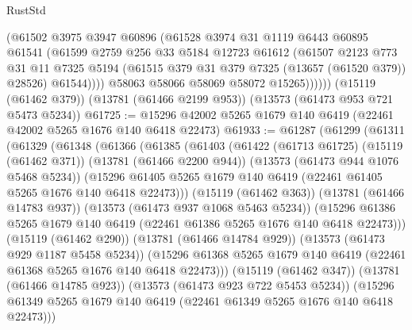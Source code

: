 \begin{lexlean}{RustStd}
\begin{coremodule}
                (@61502
                  @3975
                  @3947
                  @60896
                  (@61528
                    @3974
                    @31
                    @1119
                    @6443
                    @60895
                    @61541
                    (@61599
                      @2759
                      @256
                      @33
                      @5184
                      @12723
                      @61612
                      (@61507
                        @2123
                        @773
                        @31
                        @11
                        @7325
                        @5194
                        (@61515 @379 @31 @379 @7325 (@13657 (@61520 @379)) @28526)
                        @61544))))
                @58063
                @58066
                @58069
                @58072
                @15265))))))
    (@15119 (@61462 @379))
    (@13781 (@61466 @2199 @953))
    (@13573 (@61473 @953 @721 @5473 @5234))
@61725 := @15296 @42002 @5265 @1679 @140 @6419 (@22461 @42002 @5265 @1676 @140 @6418 @22473)
@61933 := @61287
    (@61299
      (@61311
        (@61329
          (@61348
            (@61366
              (@61385
                (@61403
                  (@61422
                    (@61713 @61725)
                    (@15119 (@61462 @371))
                    (@13781 (@61466 @2200 @944))
                    (@13573 (@61473 @944 @1076 @5468 @5234))
                    (@15296
                      @61405
                      @5265
                      @1679
                      @140
                      @6419
                      (@22461 @61405 @5265 @1676 @140 @6418 @22473)))
                  (@15119 (@61462 @363))
                  (@13781 (@61466 @14783 @937))
                  (@13573 (@61473 @937 @1068 @5463 @5234))
                  (@15296
                    @61386
                    @5265
                    @1679
                    @140
                    @6419
                    (@22461 @61386 @5265 @1676 @140 @6418 @22473)))
                (@15119 (@61462 @290))
                (@13781 (@61466 @14784 @929))
                (@13573 (@61473 @929 @1187 @5458 @5234))
                (@15296
                  @61368
                  @5265
                  @1679
                  @140
                  @6419
                  (@22461 @61368 @5265 @1676 @140 @6418 @22473)))
              (@15119 (@61462 @347))
              (@13781 (@61466 @14785 @923))
              (@13573 (@61473 @923 @722 @5453 @5234))
              (@15296 @61349 @5265 @1679 @140 @6419 (@22461 @61349 @5265 @1676 @140 @6418 @22473)))

\end{coremodule}
\end{lexlean}
